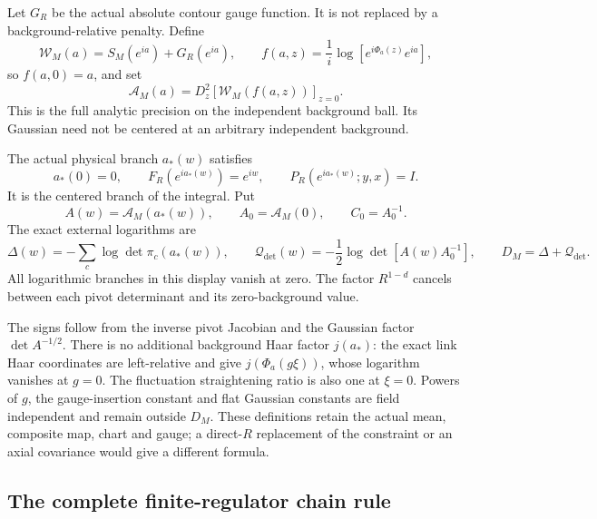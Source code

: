 Let \(G_R\) be the actual absolute contour gauge function.
It is not replaced by a background-relative penalty. Define
\begin{equation}
 \mathcal W_M(a)=S_M(e^{ia})+G_R(e^{ia}),\qquad
 f(a,z)=\frac1i\log[e^{i\Phi_a(z)}e^{ia}],
 \label{dmt-pulled-action}
\end{equation}
so \(f(a,0)=a\), and set
\begin{equation}
 \mathscr A_M(a)
    =D_z^2[\mathcal W_M(f(a,z))]_{z=0}.
 \label{dmt-independent-precision}
\end{equation}
This is the full analytic precision on the independent
background ball. Its Gaussian need not be centered at an
arbitrary independent background.

The actual physical branch \(a_*(w)\) satisfies
\[
 a_*(0)=0,\qquad F_R(e^{ia_*(w)})=e^{iw},\qquad
 P_R(e^{ia_*(w)};y,x)=I.
\]
It is the centered branch of the integral. Put
\begin{equation}
 A(w)=\mathscr A_M(a_*(w)),\qquad
 A_0=\mathscr A_M(0),\qquad C_0=A_0^{-1}.
 \label{dmt-physical-precision}
\end{equation}
The exact external logarithms are
\begin{equation}
 \Delta(w)=-\sum_c\log\det\pi_c(a_*(w)),\qquad
 \mathcal Q_{\det}(w)
       =-\frac12\log\det[A(w)A_0^{-1}],\qquad
 D_M=\Delta+\mathcal Q_{\det}.
 \label{dmt-leading-correction}
\end{equation}
All logarithmic branches in this display vanish at zero.
The factor \(R^{1-d}\) cancels between each pivot determinant
and its zero-background value.

The signs follow from the inverse pivot Jacobian and the
Gaussian factor \(\det A^{-1/2}\). There is no additional
background Haar factor \(j(a_*)\): the exact link Haar coordinates
are left-relative and give \(j(\Phi_a(g\xi))\), whose logarithm
vanishes at \(g=0\). The fluctuation straightening ratio is also
one at \(\xi=0\). Powers of \(g\), the gauge-insertion constant
and flat Gaussian constants are field independent and remain
outside \(D_M\). These definitions retain the actual mean,
composite map, chart and gauge; a direct-\(R\) replacement of
the constraint or an axial covariance would give a different
formula.

\subsection{The complete finite-regulator chain rule}
\label{dmt-chain-section}

